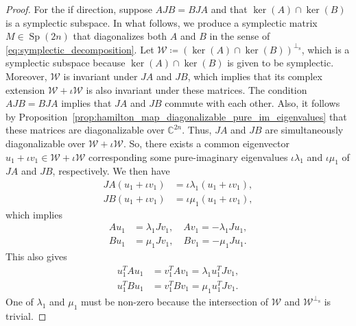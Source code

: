 \documentclass[preprint,12pt]{elsarticle}
\begin{document}
\begin{proof}
    For the if direction, suppose $AJB=BJA$ and that $\operatorname{ker}(A) \cap \operatorname{ker}(B)$ is a symplectic subspace.
    In what follows, we produce a symplectic matrix $M \in \operatorname{Sp}(2n)$ that diagonalizes both $A$ and $B$ in the sense of \eqref{eq:symplectic_decomposition}.
    \sloppy
    Let $\mathscr{W}\coloneqq \left(\operatorname{ker}(A) \cap \operatorname{ker}(B)\right)^{\perp_{\operatorname{s}}}$, which is a symplectic subspace because $\operatorname{ker}(A) \cap \operatorname{ker}(B)$ is given to be symplectic.
    Moreover, $\mathscr{W}$ is invariant under $JA$ and $JB$, which implies that its complex extension $\mathscr{W}+\iota \mathscr{W}$ is also invariant under these matrices.
    The condition $AJB=BJA$ implies that $JA$ and $JB$ commute with each other.
    Also, it follows by Proposition~\ref{prop:hamilton_map_diagonalizable_pure_im_eigenvalues} that these matrices are diagonalizable over $\mathds{C}^{2n}$.
    Thus, $JA$ and $JB$ are simultaneously diagonalizable over $\mathscr{W}+\iota \mathscr{W}$.
    So, there exists a common eigenvector $u_1+\iota v_1 \in \mathscr{W}+\iota \mathscr{W}$ corresponding some pure-imaginary eigenvalues $\iota \lambda_1$ and $\iota \mu_1$ of $JA$ and $JB$, respectively.
    We then have
    \begin{align}
        JA(u_1+\iota v_1) &= \iota \lambda_1 (u_1+\iota v_1), \label{eq:hamilton_map_eigen_equation_q} \\
         JB(u_1+\iota v_1) &= \iota \mu_1 (u_1+\iota v_1),\label{eq:hamilton_map_eigen_equation_r}
    \end{align}
    which implies
    \begin{align}
        A u_1 &=  \lambda_1 J v_1, \quad A v_1 =  - \lambda_1 J u_1, \label{eq:symp_eigvalue_relations_q} \\
        B u_1 &=  \mu_1 J v_1, \quad B v_1 =  - \mu_1  Ju_1.\label{eq:symp_eigvalue_relations_r}
    \end{align}
    This also gives 
    \begin{align}
        u_1^T A u_1 &= v_1^T A v_1 =  \lambda_1 u_1^T Jv_1, \label{eq:common_symp_eigenvalue_equality_q} \\
        u_1^T B u_1 &= v_1^T B v_1 =  \mu_1 u_1^T Jv_1. \label{eq:common_symp_eigenvalue_equality_r}
    \end{align}
    One of $\lambda_1$ and $\mu_1$ must be non-zero because the intersection of $\mathscr{W}$ and $\mathscr{W}^{\perp_{\operatorname{s}}}$ is trivial.

\end{proof}
\end{document}
